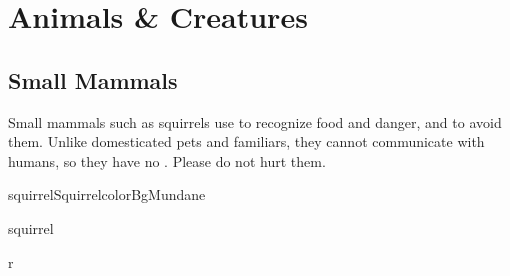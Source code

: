 \section{Animals \& Creatures}
\label{sec:animals}

\subsection{Small Mammals}


Small mammals such as squirrels use  to recognize food and danger,
and  to avoid them.
Unlike domesticated pets and familiars, they cannot communicate with
humans, so they have no .
Please do not hurt them.\\

\begin{actorCardMiniEuro}{squirrel}{Squirrel}{colorBgMundane}
	\begin{natureBox}{squirrel}
	\end{natureBox}

\end{actorCardMiniEuro}

\begin{wrapfigure}{r}{}
\end{wrapfigure}



